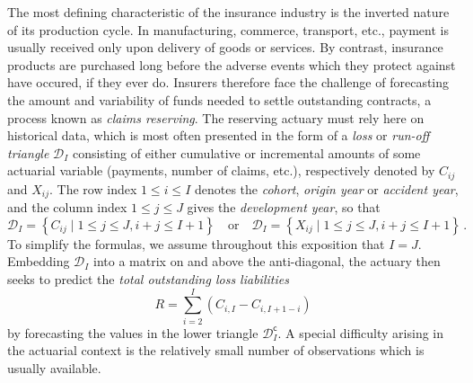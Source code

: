 \documentclass[a4paper]{book}
\begin{document}
The most defining characteristic of the insurance industry is the inverted nature of its production cycle. In manufacturing, commerce, transport, etc., payment is usually received only upon delivery of goods or services. By contrast, insurance products are purchased long before the adverse events which they protect against have occured, if they ever do. Insurers therefore face the challenge of forecasting the amount and variability of funds needed to settle outstanding contracts, a process known as \emph{claims reserving}. The reserving actuary must rely here on historical data, which is most often presented in the form of a \emph{loss} or \emph{run-off triangle} $\mathcal{D}_I$ consisting of either cumulative or incremental amounts of some actuarial variable (payments, number of claims, etc.), respectively denoted by $C_{ij}$ and $X_{ij}$. The row index $1 \leq i \leq I$ denotes the \emph{cohort}, \emph{origin year} or \emph {accident year}, and the column index $1 \leq j \leq J$ gives the \emph{development year}, so that
\begin{equation}
  \mathcal{D}_I = \left  \{ C_{ij} \mid 1 \leq j \leq J, i + j \leq I + 1 \right \}
  \quad \text{or} \quad
  \mathcal{D}_I = \left  \{ X_{ij} \mid 1 \leq j \leq J, i + j \leq I + 1 \right \} \,.
\end{equation}
To simplify the formulas, we assume throughout this exposition that $I = J$. Embedding $\mathcal{D}_I$ into a matrix on and above the anti-diagonal, the actuary then seeks to predict the \emph{total outstanding loss liabilities}
\begin{equation}
  R = \sum_{i = 2}^I (C_{i, I} - C_{i, I + 1- i})
\end{equation}
by forecasting the values in the lower triangle $\mathcal{D}^{\mathsf{c}}_I$. A special difficulty arising in the actuarial context is the relatively small number of observations which is usually available.
\end{document}
